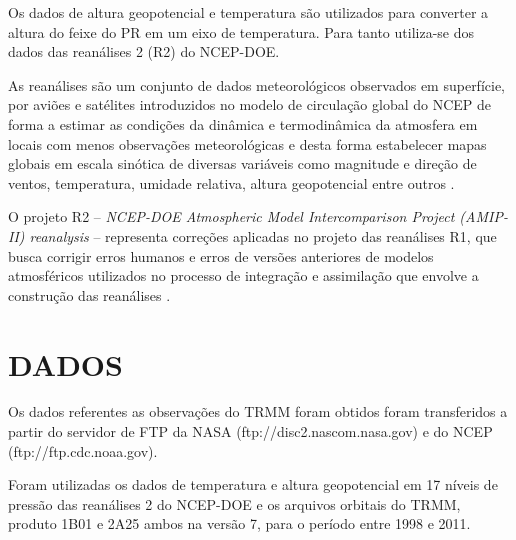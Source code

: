 Os dados de altura geopotencial e temperatura são utilizados para converter a altura do feixe do PR em um eixo de temperatura. Para tanto  utiliza-se dos dados das reanálises 2 (R2) do NCEP-DOE.   


As reanálises são um conjunto de dados meteorológicos observados em superfície, por aviões e satélites introduzidos no modelo de circulação global do NCEP de forma a estimar as condições da dinâmica e termodinâmica da atmosfera em locais com menos observações meteorológicas e desta forma estabelecer mapas globais em escala sinótica de diversas variáveis como magnitude e direção de ventos, temperatura, umidade relativa, altura geopotencial entre outros \cite{kalnay1996ncep}. 


O projeto R2  -- \textit{NCEP-DOE Atmospheric Model Intercomparison Project (AMIP-II) reanalysis} -- representa correções aplicadas no projeto das reanálises R1, que busca corrigir erros humanos e erros de versões anteriores de modelos atmosféricos utilizados no processo de integração e assimilação que envolve a construção das reanálises \cite{kanamitsu}.





\section{DADOS}

Os dados referentes as observações do TRMM foram obtidos foram transferidos a partir do servidor de FTP da NASA (ftp://disc2.nascom.nasa.gov) e do NCEP (ftp://ftp.cdc.noaa.gov).

Foram utilizadas os dados de temperatura e altura geopotencial em 17 níveis de pressão das reanálises 2 do NCEP-DOE e os arquivos orbitais do TRMM, produto 1B01 e 2A25 ambos na versão 7, para o período entre 1998 e 2011. 



